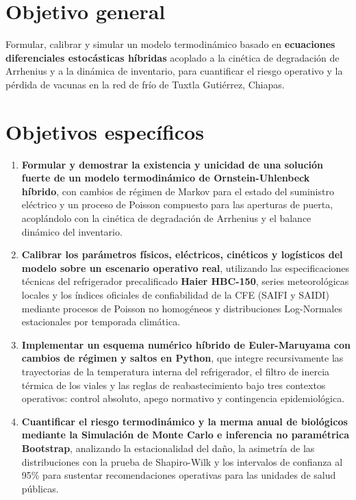 \documentclass[
  spanish,
  us-letterpaper,
]{scrreprt}
\numberwithin{equation}{section}
\theoremstyle{plain}
\theoremstyle{plain}
\theoremstyle{definition}
\theoremstyle{plain}
\theoremstyle{remark}
\begin{document}
\section{Objetivo general}\label{objetivo-general}

Formular, calibrar y simular un modelo termodinámico basado en
\textbf{ecuaciones diferenciales estocásticas híbridas} acoplado a la
cinética de degradación de Arrhenius y a la dinámica de inventario, para
cuantificar el riesgo operativo y la pérdida de vacunas en la red de
frío de Tuxtla Gutiérrez, Chiapas.

\section{Objetivos específicos}\label{objetivos-especuxedficos}

\begin{enumerate}
\def\labelenumi{\arabic{enumi}.}
\item
  \textbf{Formular y demostrar la existencia y unicidad de una solución
  fuerte de un modelo termodinámico de Ornstein-Uhlenbeck híbrido}, con
  cambios de régimen de Markov para el estado del suministro eléctrico y
  un proceso de Poisson compuesto para las aperturas de puerta,
  acoplándolo con la cinética de degradación de Arrhenius y el balance
  dinámico del inventario.
\item
  \textbf{Calibrar los parámetros físicos, eléctricos, cinéticos y
  logísticos del modelo sobre un escenario operativo real}, utilizando
  las especificaciones técnicas del refrigerador precalificado
  \textbf{Haier HBC-150}, series meteorológicas locales y los índices
  oficiales de confiabilidad de la CFE (SAIFI y SAIDI) mediante procesos
  de Poisson no homogéneos y distribuciones Log-Normales estacionales
  por temporada climática.
\item
  \textbf{Implementar un esquema numérico híbrido de Euler-Maruyama con
  cambios de régimen y saltos en Python}, que integre recursivamente las
  trayectorias de la temperatura interna del refrigerador, el filtro de
  inercia térmica de los viales y las reglas de reabastecimiento bajo
  tres contextos operativos: control absoluto, apego normativo y
  contingencia epidemiológica.
\item
  \textbf{Cuantificar el riesgo termodinámico y la merma anual de
  biológicos mediante la Simulación de Monte Carlo e inferencia no
  paramétrica Bootstrap}, analizando la estacionalidad del daño, la
  asimetría de las distribuciones con la prueba de Shapiro-Wilk y los
  intervalos de confianza al 95\% para sustentar recomendaciones
  operativas para las unidades de salud públicas.
\end{enumerate}
\end{document}
